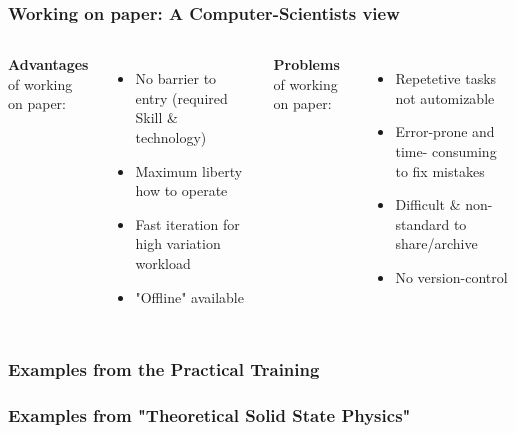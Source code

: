 \begin{frame}
    \frametitle{Working on paper: A Computer-Scientists view}

    \begin{columns}[t]
            \textbf{Advantages} of working on paper:
            \begin{itemize}
                \item No barrier to entry (required Skill \& technology)
                \item Maximum liberty how to operate
                \item Fast iteration for high variation workload
                \item "Offline" available
            \end{itemize}
        
            \textbf{Problems} of working on paper:
            \begin{itemize}
                \item Repetetive tasks not automizable
                \item Error-prone and time- consuming to fix mistakes
                \item Difficult \& non-standard to share/archive
                \item No version-control
            \end{itemize}
            
    \end{columns}
\end{frame}

\begin{frame}
    \frametitle{Examples from the Practical Training}
\end{frame}

\begin{frame}
    \frametitle{Examples from "Theoretical Solid State Physics"}
\end{frame}

